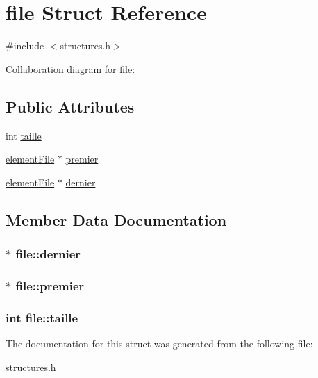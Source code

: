 \hypertarget{structfile}{\section{file Struct Reference}
\label{structfile}
}


{\ttfamily \#include $<$structures.\+h$>$}



Collaboration diagram for file\+:
\subsection*{Public Attributes}
\begin{DoxyCompactItemize}
\item 
int \hyperlink{structfile_aab17f69058d7bf27b89447a062d6b0a9}{taille}
\item 
\hyperlink{structelementFile}{element\+File} $\ast$ \hyperlink{structfile_a5e645c1b66a436723569c5e7d6700429}{premier}
\item 
\hyperlink{structelementFile}{element\+File} $\ast$ \hyperlink{structfile_af3ab7228e26e48ee577cb48866a2514b}{dernier}
\end{DoxyCompactItemize}


\subsection{Member Data Documentation}
\hypertarget{structfile_af3ab7228e26e48ee577cb48866a2514b}{
\subsubsection[{dernier}]{$\ast$ file\+::dernier}}\label{structfile_af3ab7228e26e48ee577cb48866a2514b}
\hypertarget{structfile_a5e645c1b66a436723569c5e7d6700429}{
\subsubsection[{premier}]{$\ast$ file\+::premier}}\label{structfile_a5e645c1b66a436723569c5e7d6700429}
\hypertarget{structfile_aab17f69058d7bf27b89447a062d6b0a9}{
\subsubsection[{taille}]{\setlength{\rightskip}{0pt plus 5cm}int file\+::taille}}\label{structfile_aab17f69058d7bf27b89447a062d6b0a9}


The documentation for this struct was generated from the following file\+:\begin{DoxyCompactItemize}
\item 
\hyperlink{structures_8h}{structures.\+h}\end{DoxyCompactItemize}
